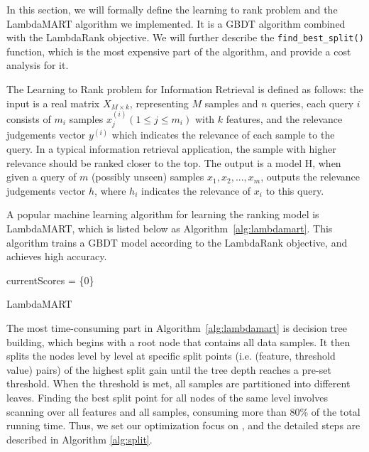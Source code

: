In this section, we will formally define the learning to rank problem and the LambdaMART algorithm we implemented. It is a GBDT algorithm combined with the LambdaRank objective. We will further describe the \texttt{find\_best\_split()} function, which is the most expensive part of the algorithm,
and provide a cost analysis for it.

The Learning to Rank problem for Information Retrieval \cite{ltr2009} is defined as follows: the input is a real matrix $X_{M \times k}$, representing $M$ samples and $n$ queries, each query $i$ consists of $m_i$ samples $x^{(i)}_j (1\le j \le m_i)$ with $k$ features, and the relevance judgements vector $y^{(i)}$ which indicates the relevance of each sample to the query. In a typical information retrieval application, the sample with higher relevance should be ranked closer to the top. The output is a model H, when given a query of $m$ (possibly unseen) samples ${x_1, x_2, ..., x_m}$, outputs the relevance judgements vector $h$, where $h_i$ indicates the relevance of $x_i$ to this query.

A popular machine learning algorithm for learning the ranking model is LambdaMART, which is listed below as Algorithm~\ref{alg:lambdamart}. This algorithm trains a GBDT model according to the LambdaRank objective, and achieves high accuracy.

\begin{algorithm}[ht]
 \SetAlgoLined
 currentScores = \{0\}\;
 \caption{LambdaMART}
 \label{alg:lambdamart}
\end{algorithm}

\mypar{\findbestsplit}
The most time-consuming part in Algorithm~\ref{alg:lambdamart} is decision tree building, which begins with a root node that contains all data samples. It then splits the nodes level by level at specific split points (i.e. (feature, threshold value) pairs) of the highest split gain until the tree depth reaches a pre-set threshold. When the threshold is met, all samples are partitioned into different leaves. Finding the best split point for all nodes of the same level involves scanning over all features and all samples, consuming more than 80\% of the total running time. Thus, we set our optimization focus on \findbestsplit, and the detailed steps are described in Algorithm \ref{alg:split}.

